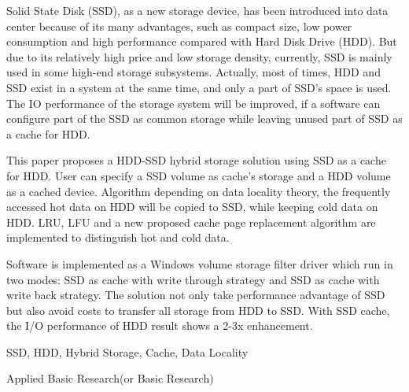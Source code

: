 \begin{eabstract}

Solid State Disk (SSD), as a new storage device, has been introduced into data center because of its many advantages, such as compact size, low power consumption and high performance compared with Hard Disk Drive (HDD). But due to its relatively high price and low storage density, currently, SSD is mainly used in some high-end storage subsystems. Actually, most of times, HDD and SSD exist in a system at the same time, and only a part of SSD's space is used. The IO performance of the storage system will be improved, if a software can configure part of the SSD as common storage while leaving unused part of SSD as a cache for HDD.

This paper proposes a HDD-SSD hybrid storage solution using SSD as a cache for HDD. User can specify a SSD volume as cache's storage and a HDD volume as a cached device. Algorithm depending on data locality theory, the frequently accessed hot data on HDD will be copied to SSD, while keeping cold data on HDD. LRU, LFU and a new proposed cache page replacement algorithm are implemented to distinguish hot and cold data.

Software is implemented as a Windows volume storage filter driver which run in two modes: SSD as cache with write through strategy and SSD as cache with write back strategy. The solution not only take performance advantage of SSD but also avoid costs to transfer all storage from HDD to SSD. With SSD cache, the I/O performance of HDD result shows a 2-3x enhancement.

\end{eabstract}

\begin{ekeywords}
SSD, HDD, Hybrid Storage, Cache, Data Locality
\end{ekeywords}

\begin{ethesistype}
Applied Basic Research(or Basic Research)
\end{ethesistype}

